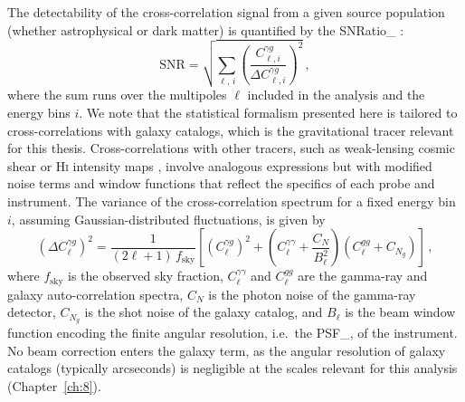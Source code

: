 The detectability of the cross-correlation signal from a given source population (whether astrophysical or dark matter) is quantified by the \gls{SNRatio_} \cite{Fornengo:2013rga}:
\begin{equation}
	\mathrm{SNR} = \sqrt{\sum_{\ell,\, i} \left(\frac{C_{\ell,i}^{\gamma g}}{\Delta C_{\ell,i}^{\gamma g}}\right)^2}\,,
	\label{eq:snr}
\end{equation}
where the sum runs over the multipoles $\ell$ included in the analysis and the energy bins $i$.
We note that the statistical formalism presented here is tailored to cross-correlations with galaxy catalogs, which is the gravitational tracer relevant for this thesis. Cross-correlations with other tracers, such as weak-lensing cosmic shear \cite{Camera:2012cj,Shirasaki:2014noa,troster2017cross,DES:2019ucp} or \textsc{Hi} intensity maps \cite{Pinetti:2019ztr}, involve analogous expressions but with modified noise terms and window functions that reflect the specifics of each probe and instrument.
The variance of the cross-correlation spectrum for a fixed energy bin $i$, assuming Gaussian-distributed fluctuations, is given by \cite{Fornengo:2013rga}
\begin{equation}
	(\Delta C_\ell^{\gamma g})^2 = \frac{1}{(2\ell+1)\, f_\mathrm{sky}} \left[(C_\ell^{\gamma g})^2 + \left(C_\ell^{\gamma\gamma} + \frac{C_N}{B_\ell^2}\right)(C_\ell^{gg} + C_{N_g})\right]\,,
	\label{eq:variance_cross}
\end{equation}
where $f_\mathrm{sky}$ is the observed sky fraction, $C_\ell^{\gamma\gamma}$ and $C_\ell^{gg}$ are the gamma-ray and galaxy auto-correlation spectra, $C_N$ is the photon noise of the gamma-ray detector, $C_{N_g}$ is the shot noise of the galaxy catalog, and $B_\ell$ is the beam window function encoding the finite angular resolution, i.e.\ the \gls{PSF_}, of the instrument.
No beam correction enters the galaxy term, as the angular resolution of galaxy catalogs (typically arcseconds) is negligible at the scales relevant for this analysis (Chapter~\ref{ch:8}).

